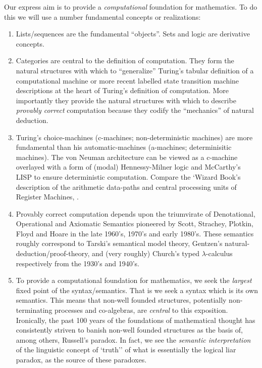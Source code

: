 
Our express aim is to provide a \emph{computational} foundation for mathematics.
To do this we will use a number fundamental concepts or realizations:
\begin{enumerate}
\item	Lists/sequences are the fundamental ``objects''. Sets and logic are
derivative concepts.

\item	Categories are central to the definition of computation. They form the
natural structures with which to ``generalize'' Turing's tabular definition of a
computational machine or more recent labelled state transition machine
descriptions at the heart of Turing's definition of computation. More
importantly they provide the natural structures with which to describe
\emph{provably correct} computation because they codify the ``mechanics'' of
natural deduction.

\item	Turing's choice-machines (c-machines; non-deterministic machines) are more
fundamental than his automatic-machines (a-machines; determinisitic machines).
The von Neuman architecture can be viewed as a c-machine overlayed with a form
of (modal) Hennessy-Milner logic and McCarthy's LISP to ensure deterministic
computation. Compare the `Wizard Book's description of the arithmetic data-paths
and central processing units of Register Machines, \cite[Chapter
5]{abelsonSussmanSussman1996structureInterpretationComputerPrograms}.

\item	Provably correct computation depends upon the triumvirate of Denotational,
Operational and Axiomatic Semantics pioneered by Scott, Strachey, Plotkin, Floyd
and Hoare in the late 1960's, 1970's and early 1980's. These semantics roughly
correspond to Tarski's semantical model theory, Gentzen's
natural-deduction/proof-theory, and (very roughly) Church's typed
$\lambda$-calculus respectively from the 1930's and 1940's.

\item	To provide a computational foundation for mathematics, we seek the
\emph{largest} fixed point of the syntax/semantics.  That is we seek a syntax
which is its own semantics. This means that non-well founded structures,
potentially non-terminating processes and co-algebras, are \emph{central} to
this exposition. Ironically, the past 100 years of the foundations of
mathematical thought has consistently striven to banish non-well founded
structures as the basis of, among others, Russell's paradox. In fact, we see the
\emph{semantic interpretation} of the linguistic concept of `truth'' of what is
essentially the logical liar paradox, as the source of these paradoxes.


\end{enumerate}
